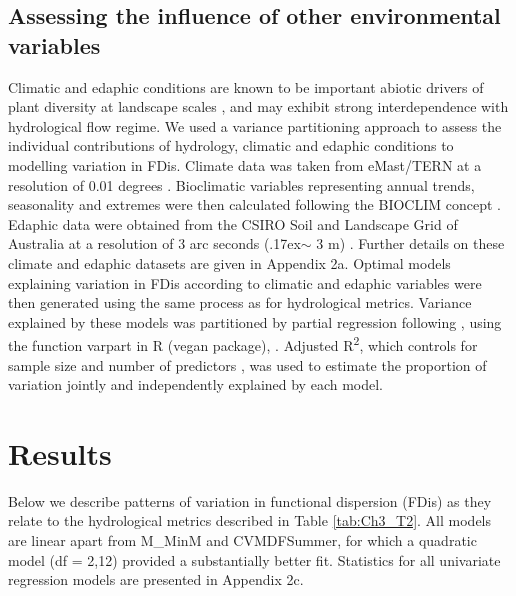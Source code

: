 \subsection{Assessing the influence of other environmental variables}
Climatic and edaphic conditions are known to be important abiotic drivers of plant diversity at landscape scales \citep{Laliberte2013, Vazquez-Rivera2015}, and may exhibit strong interdependence with hydrological flow regime. We used a variance partitioning approach to assess the individual contributions of hydrology, climatic and edaphic conditions to modelling variation in FDis. Climate data was taken from eMast/TERN at a resolution of 0.01 degrees \citep{Hutchinson2014}.  Bioclimatic variables representing annual trends, seasonality and extremes were then calculated following the BIOCLIM concept \citep{busby1991bioclim}. Edaphic data were obtained from the CSIRO Soil and Landscape Grid of Australia at a resolution of 3 arc seconds ({\raise.17ex\hbox{$\scriptstyle\mathtt{\sim}$}} 3 m) \citep{Rossel2014, Rossel2014a, Rossel2014b, Rossel2014c, Rossel2014d, Rossel2014e, Rossel2014f, Rossel2014g, Rossel2014h, Rossel2014i, Rossel2014j; Wilford2014}. Further details on these climate and edaphic datasets are given in Appendix 2a. Optimal models explaining variation in FDis according to climatic and edaphic variables were then generated using the same process as for hydrological metrics. Variance explained by these models was partitioned by partial regression following \citet{Legendre2007}, using the function varpart in R (vegan package), \citep{Oksanen2013}. Adjusted R\textsuperscript{2}, which controls for sample size and number of predictors \citep{Peres-Neto2006}, was used to estimate the proportion of variation jointly and independently explained by each model.

\section{Results}
Below we describe patterns of variation in functional dispersion (FDis) as they relate to the hydrological metrics described in Table \ref{tab:Ch3_T2}. All models are linear apart from M\_MinM and CVMDFSummer, for which a quadratic model (df = 2,12) provided a substantially better fit. Statistics for all univariate regression models are presented in Appendix 2c.

